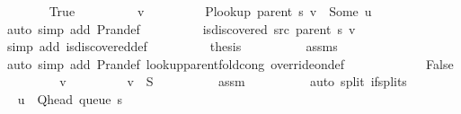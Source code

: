 \begin{isabellebody}
\ \ \ \ \ \ \isamarkupfalse%
\ True\isanewline
\ \ \ \ \ \ \isamarkupfalse%
\ \isamarkupfalse%
\ v\ \isanewline
\ \ \ \ \ \ \ \ {\isachardoublequoteopen}P{\isacharunderscore}{\kern0pt}lookup\ {\isacharparenleft}{\kern0pt}parent\ s{\isacharparenright}{\kern0pt}\ v\ {\isacharequal}{\kern0pt}\ Some\ u{\isachardoublequoteclose}\isanewline
\ \ \ \ \ \ \ \ \isamarkupfalse%
\ {\isacharparenleft}{\kern0pt}auto\ simp\ add{\isacharcolon}{\kern0pt}\ P{\isachardot}{\kern0pt}ran{\isacharunderscore}{\kern0pt}def{\isacharparenright}{\kern0pt}\isanewline
\ \ \ \ \ \ \isamarkupfalse%
\ \isamarkupfalse%
\ {\isachardoublequoteopen}is{\isacharunderscore}{\kern0pt}discovered\ src\ {\isacharparenleft}{\kern0pt}parent\ s{\isacharparenright}{\kern0pt}\ v{\isachardoublequoteclose}\isanewline
\ \ \ \ \ \ \ \ \isamarkupfalse%
\ {\isacharparenleft}{\kern0pt}simp\ add{\isacharcolon}{\kern0pt}\ is{\isacharunderscore}{\kern0pt}discovered{\isacharunderscore}{\kern0pt}def{\isacharparenright}{\kern0pt}\isanewline
\ \ \ \ \ \ \isamarkupfalse%
\ \isamarkupfalse%
\ {\isacharquery}{\kern0pt}thesis\isanewline
\ \ \ \ \ \ \ \ \isamarkupfalse%
\ assms\isanewline
\ \ \ \ \ \ \ \ \isamarkupfalse%
\ {\isacharparenleft}{\kern0pt}auto\ simp\ add{\isacharcolon}{\kern0pt}\ P{\isachardot}{\kern0pt}ran{\isacharunderscore}{\kern0pt}def\ lookup{\isacharunderscore}{\kern0pt}parent{\isacharunderscore}{\kern0pt}fold{\isacharunderscore}{\kern0pt}cong{\isacharunderscore}{\kern0pt}{}\ override{\isacharunderscore}{\kern0pt}on{\isacharunderscore}{\kern0pt}def{\isacharparenright}{\kern0pt}\isanewline
\ \ \ \ \isamarkupfalse%
\isanewline
\ \ \ \ \ \ \isamarkupfalse%
\ False\isanewline
\ \ \ \ \ \ \isamarkupfalse%
\ \isamarkupfalse%
\ v\ \isanewline
\ \ \ \ \ \ \ \ {\isachardoublequoteopen}v\ {\isasymin}\ {\isacharquery}{\kern0pt}S{\isachardoublequoteclose}\isanewline
\ \ \ \ \ \ \ \ \isamarkupfalse%
\ assm\isanewline
\ \ \ \ \ \ \ \ \isamarkupfalse%
\ {\isacharparenleft}{\kern0pt}auto\ split{\isacharcolon}{\kern0pt}\ if{\isacharunderscore}{\kern0pt}splits{\isacharparenleft}{\kern0pt}{}{\isacharparenright}{\kern0pt}{\isacharparenright}{\kern0pt}\isanewline
\ \ \ \ \ \ \isamarkupfalse%
\ \isamarkupfalse%
\ {\isachardoublequoteopen}u\ {\isacharequal}{\kern0pt}\ Q{\isacharunderscore}{\kern0pt}head\ {\isacharparenleft}{\kern0pt}queue\ s{\isacharparenright}{\kern0pt}{\isachardoublequoteclose}\isanewline

\end{isabellebody}

